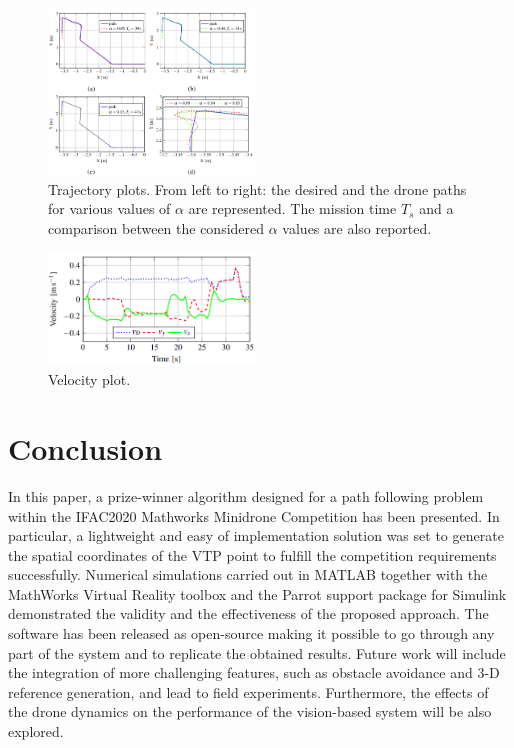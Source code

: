 \documentclass[a4paper,twocolumn,10pt]{article}
\begin{document}
    \begin{figure}
        \centering
        \includegraphics[width=0.49\textwidth]{pics/fig10_graph.png}
        \caption{Trajectory plots. From left to right: the desired and the drone paths for various values of $\alpha$ are represented. The mission time $T_s$ and a comparison between the considered $\alpha$ values are also reported.}
        \label{fig:fig10graphs}
    \end{figure}
    \begin{figure}
        \centering
        \includegraphics[width=0.49\textwidth]{pics/fig11_graph.png}
        \caption{Velocity plot.}
        \label{fig:fig11graph}
    \end{figure}

    \section{Conclusion}
    \label{sec:conclusions}
    In this paper, a prize-winner algorithm designed for a path following problem within the IFAC2020 Mathworks Minidrone Competition has been presented. In particular, a lightweight and easy of implementation solution was set to generate the spatial coordinates of the VTP point to fulfill the competition requirements successfully. Numerical simulations carried out in MATLAB together with the MathWorks Virtual Reality toolbox and the Parrot support package for Simulink demonstrated the validity and the effectiveness of the proposed approach. The software has been released as open-source making it possible to go through any part of the system and to replicate the obtained results. Future work will include the integration of more challenging features, such as obstacle avoidance and 3-D reference generation, and lead to field experiments. Furthermore, the effects of the drone dynamics on the performance of the vision-based system will be also explored. 
\end{document}
